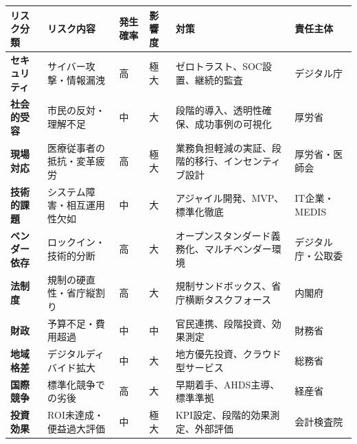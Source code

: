 \documentclass[
  a4paper,
  a4paper,
  11pt]{ltjsbook}
\begin{document}
\begin{longtable}[]{@{}
  >{\raggedright\arraybackslash}p{}
  >{\raggedright\arraybackslash}p{}
  >{\raggedright\arraybackslash}p{}
  >{\raggedright\arraybackslash}p{}
  >{\raggedright\arraybackslash}p{}
  >{\raggedright\arraybackslash}p{}@{}}
\toprule\noalign{}
\begin{minipage}[b]{\linewidth}\raggedright
リスク分類
\end{minipage} & \begin{minipage}[b]{\linewidth}\raggedright
リスク内容
\end{minipage} & \begin{minipage}[b]{\linewidth}\raggedright
発生確率
\end{minipage} & \begin{minipage}[b]{\linewidth}\raggedright
影響度
\end{minipage} & \begin{minipage}[b]{\linewidth}\raggedright
対策
\end{minipage} & \begin{minipage}[b]{\linewidth}\raggedright
責任主体
\end{minipage} \\
\midrule\noalign{}
\endhead
\bottomrule\noalign{}
\endlastfoot
\textbf{セキュリティ} & サイバー攻撃・情報漏洩 & 高 & 極大 &
ゼロトラスト、SOC設置、継続的監査 & デジタル庁 \\
\textbf{社会的受容} & 市民の反対・理解不足 & 中 & 大 &
段階的導入、透明性確保、成功事例の可視化 & 厚労省 \\
\textbf{現場対応} & 医療従事者の抵抗・変革疲労 & 高 & 極大 &
業務負担軽減の実証、段階的移行、インセンティブ設計 & 厚労省・医師会 \\
\textbf{技術的課題} & システム障害・相互運用性欠如 & 中 & 大 &
アジャイル開発、MVP、標準化徹底 & IT企業・MEDIS \\
\textbf{ベンダー依存} & ロックイン・技術的分断 & 高 & 大 &
オープンスタンダード義務化、マルチベンダー環境 & デジタル庁・公取委 \\
\textbf{法制度} & 規制の硬直性・省庁縦割り & 高 & 大 &
規制サンドボックス、省庁横断タスクフォース & 内閣府 \\
\textbf{財政} & 予算不足・費用超過 & 中 & 中 &
官民連携、段階投資、効果測定 & 財務省 \\
\textbf{地域格差} & デジタルディバイド拡大 & 中 & 大 &
地方優先投資、クラウド型サービス & 総務省 \\
\textbf{国際競争} & 標準化競争での劣後 & 高 & 大 &
早期着手、AHDS主導、標準準拠 & 経産省 \\
\textbf{投資効果} & ROI未達成・便益過大評価 & 中 & 極大 &
KPI設定、段階的効果測定、外部評価 & 会計検査院 \\
\end{longtable}
\end{document}
